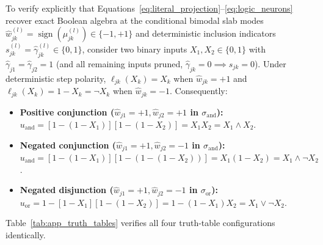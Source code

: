 \documentclass[11pt,a4paper]{article}
\begin{document}
To verify explicitly that Equations~\eqref{eq:literal_projection}--\eqref{eq:logic_neurons} recover exact Boolean algebra at the conditional bimodal slab modes $\hat{w}_{jk}^{(l)} = \operatorname{sign}(\mu_{jk}^{(l)}) \in \{-1, +1\}$ and deterministic inclusion indicators $s_{jk}^{(l)} = \hat{\gamma}_{jk}^{(l)} \in \{0, 1\}$, consider two binary inputs $X_1, X_2 \in \{0, 1\}$ with $\hat{\gamma}_{j1} = \hat{\gamma}_{j2} = 1$ (and all remaining inputs pruned, $\hat{\gamma}_{jk} = 0 \implies s_{jk} = 0$). Under deterministic step polarity, $\ell_{jk}(X_k) = X_k$ when $\hat{w}_{jk} = +1$ and $\ell_{jk}(X_k) = 1 - X_k = \neg X_k$ when $\hat{w}_{jk} = -1$. Consequently:
\begin{itemize}
  \item \textbf{Positive conjunction ($\hat{w}_{j1} = +1, \hat{w}_{j2} = +1$ in $\sigma_{\text{and}}$):} $u_{\text{and}} = [1 - (1 - X_1)][1 - (1 - X_2)] = X_1 X_2 = X_1 \land X_2$.
  \item \textbf{Negated conjunction ($\hat{w}_{j1} = +1, \hat{w}_{j2} = -1$ in $\sigma_{\text{and}}$):} $u_{\text{and}} = [1 - (1 - X_1)][1 - (1 - (1 - X_2))] = X_1(1 - X_2) = X_1 \land \neg X_2$.
  \item \textbf{Negated disjunction ($\hat{w}_{j1} = +1, \hat{w}_{j2} = -1$ in $\sigma_{\text{or}}$):} $u_{\text{or}} = 1 - [1 - X_1][1 - (1 - X_2)] = 1 - (1 - X_1)X_2 = X_1 \lor \neg X_2$.
\end{itemize}
Table~\ref{tab:app_truth_tables} verifies all four truth-table configurations identically.

\begin{table}[htbp]
\centering
\caption{Exact truth-table evaluation of Equations~\eqref{eq:literal_projection}--\eqref{eq:logic_neurons} for two binary inputs $(X_1, X_2) \in \{0, 1\}^2$ at the bimodal slab modes $\hat{w}_{jk} \in \{-1, +1\}$ with inactive edges pruned ($s_{jk} = 0$ for $k > 2$).}
\label{tab:app_truth_tables}
\end{table}
\end{document}
